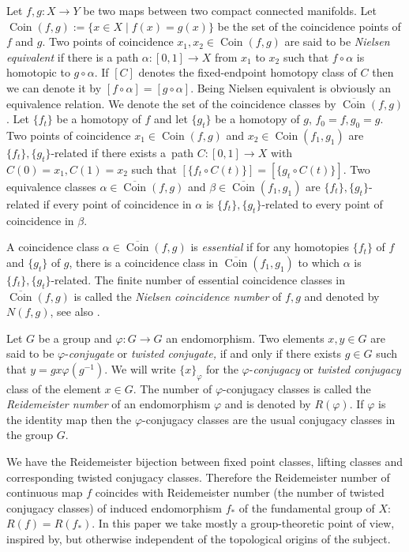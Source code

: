 \documentclass[12pt, a4paper]{amsart}
\def\Coin{\operatorname{Coin}}
\begin{document}
Let $f, g: X \to Y$ be two maps between two compact connected manifolds.
Let
$\Coin(f,g) := \{ x \in X \mid f(x) = g(x) \}$ be the set of the coincidence  points of $f$ and $g$.
Two points of coincidence $x_1,x_2 \in \Coin(f,g)$ are said to be \emph{Nielsen equivalent} if there is a path
$\alpha:[0,1] \to X$ from $x_1$ to $x_2$ such that $f \circ \alpha$ is homotopic to $g \circ \alpha$.
If $[C]$ denotes the fixed-endpoint homotopy class of $C$
then we can denote it by $[f \circ \alpha] = [g \circ \alpha]$.
Being Nielsen equivalent is obviously an equivalence relation.
We denote the set of the coincidence classes by $\overline{\Coin}(f,g)$.
Let $\{f_t\}$ be a homotopy of $f$ and let $\{g_t\}$ be a homotopy of $g$, $f_0 = f, g_0 = g$.
Two points of coincidence $x_1 \in \Coin(f,g)$ and $x_2 \in \Coin(f_1, g_1)$ are $\{f_t\},\{g_t\}$-related
if there exists a~path $C:[0,1] \to X$ with $C(0) = x_1, C(1) = x_2$ such that
$[\{f_t \circ C(t)\}] = [\{g_t \circ C(t)\}]$.
Two equivalence classes $\alpha \in \overline{\Coin}(f,g)$ and $\beta \in \overline{\Coin}(f_1,g_1)$
are $\{f_t\},\{g_t\}$-related if every point of coincidence in $\alpha$ is $\{f_t\},\{g_t\}$-related
to every point of coincidence in $\beta$.

A coincidence class $\alpha \in \overline{\Coin}(f,g)$ is \emph{essential}
if for any homotopies $\{f_t\}$ of $f$ and $\{g_t\}$ of $g$, there is a coincidence class
in $\overline{\Coin}(f_1,g_1)$ to which $\alpha$ is $\{f_t\},\{g_t\}$-related.
The finite number of essential coincidence classes in $\overline{\Coin}(f,g)$ is called
the \emph{Nielsen coincidence number} of $f,g$ and denoted by $N(f,g)$,
see also \cite{Wong}.

Let $G$ be a  group and $\varphi: G\rightarrow G$ an
endomorphism. Two elements $x,y\in G$ are said to be
$\varphi$-{\em conjugate} or {\em twisted conjugate,}
if and only if there exists $g \in G$ such that $ y=g  x   \varphi(g^{-1}).$
We will write $\{x\}_\varphi$ for the $\varphi$-{\em conjugacy} or
{\em twisted conjugacy} class
of the element $x\in G$.
The number of $\varphi$-conjugacy classes is called the {\em Reidemeister number}
of an  endomorphism $\varphi$ and is  denoted by $R(\varphi)$.
If $\varphi$ is the identity map then the $\varphi$-conjugacy classes are the usual
conjugacy classes in the group $G$.


We have the Reidemeister bijection between  fixed point classes, lifting classes and corresponding twisted conjugacy
classes. Therefore the
Reidemeister number of continuous map  $f$ coincides with Reidemeister number
(the number of twisted conjugacy classes) of induced endomorphism $f_*$ of the fundamental group of $X$: $R(f)=R(f_*)$.
In this paper we take mostly a group-theoretic point of view,
inspired by, but otherwise  independent of the topological
origins of the subject.
\end{document}
